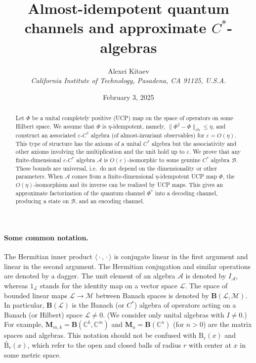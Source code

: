\documentclass[12pt]{article}
\title{Almost-idempotent quantum channels and approximate $C^*$-algebras}
\author{Alexei Kitaev\\
\normalsize\it California Institute of Technology, Pasadena, CA 91125, U.S.A.}
\date{February 3, 2025}
\newcommand{\CC}{\mathbb{C}}
\newcommand{\calA}{\mathcal{A}}
\newcommand{\calL}{\mathcal{L}}
\newcommand{\calM}{\mathcal{M}}
\newcommand{\Ba}{\mathrm{B}}
\newcommand{\Bo}{\mathbf{B}}
\newcommand*{\Ma}[1]{\mathbf{M}_{#1}}
\newcommand*{\braket}[2]{\langle{#1},{#2}\rangle}
\renewcommand{\le}{\leqslant}
\newtheorem[definition]{Definition}[Theorem]{Definition}
\newtheorem[remark]{Example}[Theorem]{Example}
\newtheorem[remark]{Remark}[Theorem]{Remark}
\newtheorem[remark]{Question}[Theorem]{Open question}
\newtheorem*[definition]{definition}{Definition}
\newtheorem*[remark]{example}{Example}
\newtheorem*[remark]{remark}{Remark}
\newtheorem*[remark]{question}{Open question}
\numberwithin{equation}{section}
\begin{document}
\maketitle

\begin{abstract}
Let $\Phi$ be a unital completely positive (UCP) map on the space of operators on some Hilbert space. We assume that $\Phi$ is $\eta$-idempotent, namely, $\|\Phi^2-\Phi\|_{\mathrm{cb}} \le\eta$, and construct an associated $\varepsilon$-$C^*$ algebra (of almost-invariant observables) for $\varepsilon=O(\eta)$. This type of structure has the axioms of a unital $C^*$ algebra but the associativity and other axioms involving the multiplication and the unit hold up to $\varepsilon$. We prove that any finite-dimensional $\varepsilon$-$C^*$ algebra $\mathcal{A}$ is $O(\varepsilon)$-isomorphic to some genuine $C^*$ algebra $\mathcal{B}$. These bounds are universal, i.e.\ do not depend on the dimensionality or other parameters. When $\mathcal{A}$ comes from a finite-dimensional $\eta$-idempotent UCP map $\Phi$, the $O(\eta)$-isomorphism and its inverse can be realized by UCP maps. This gives an approximate factorization of the quantum channel $\Phi^*$ into a decoding channel, producing a state on $\mathcal{B}$, and an encoding channel.
\end{abstract}

\setcounter{tocdepth}{2}
\tableofcontents

\paragraph*{Some common notation.} The Hermitian inner product $\braket{{}\cdot{}}{{}\cdot{}}$ is conjugate linear in the first argument and linear in the second argument. The Hermitian conjugation and similar operations are denoted by a dagger. The unit element of an algebra $\calA$ is denoted by $I_\calA$, whereas $1_\calL$ stands for the identity map on a vector space $\calL$. The space of bounded linear maps $\calL\to\calM$ between Banach spaces is denoted by $\Bo(\calL,\calM)$. In particular, $\Bo(\calL)$ is the Banach (or $C^*$) algebra of operators acting on a Banach (or Hilbert) space $\calL\not=0$. (We consider only unital algebras with $I\not=0$.) For example, $\Ma{m,k}=\Bo(\CC^k,\CC^m)$ and $\Ma{n}=\Bo(\CC^n)$ (for $n>0$) are the matrix spaces and algebras. This notation should not be confused with $\Ba_r(x)$ and $\bar{\Ba}_r(x)$, which refer to the open and closed balls of radius $r$ with center at $x$ in some metric space. 
\medskip
\end{document}
